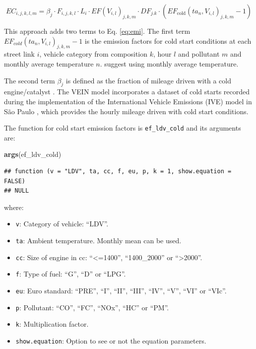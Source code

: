 \documentclass[12pt,graybox,envcountchap,sectrefs]{krantz}
\makeatletter
\newenvironment{Shaded}{\begin{snugshade}}{\end{snugshade}}
\newcommand{\KeywordTok}[1]{\textcolor[rgb]{0.13,0.29,0.53}{\textbf{#1}}}
\newcommand{\NormalTok}[1]{#1}
\providecommand{\tightlist}{%
  \setlength{\itemsep}{0pt}\setlength{\parskip}{0pt}}
\newenvironment{kframe}{%
\medskip{}
\setlength{\fboxsep}{.8em}
 \def\at@end@of@kframe{}%
 \ifinner\ifhmode%
  \def\at@end@of@kframe{\end{minipage}}%
  \begin{minipage}{\columnwidth}%
 \fi\fi%
 \def\FrameCommand##1{\hskip\@totalleftmargin \hskip-\fboxsep
 \colorbox{shadecolor}{##1}\hskip-\fboxsep
     \hskip-\linewidth \hskip-\@totalleftmargin \hskip\columnwidth}%
 \MakeFramed {\advance\hsize-\width
   \@totalleftmargin\z@ \linewidth\hsize
   \@setminipage}}%
 {\par\unskip\endMakeFramed%
 \at@end@of@kframe}
\renewenvironment{Shaded}{\begin{kframe}}{\end{kframe}}
\theoremstyle{definition}
\theoremstyle{definition}
\theoremstyle{definition}
\theoremstyle{remark}
\makeatother
\begin{document}
\begin{equation}
EC_{i,j,k,l,m} =\beta_{j} \cdot F_{i,j,k,l} \cdot L_i \cdot EF(V_{i,l})_{j,k,m} \cdot DF_{j.k} \cdot \left(EF_{\mbox{cold}}(ta_n,V_{i,l})_{j,k,m}-1\right)
\label{eq:cold}
\end{equation}

This approach adds two terms to Eq. \ref{eq:emi}. The first term
\(EF_{cold}(ta_n,V_{i,l})_{j,k,m}-1\) is the emission factors for cold
start conditions at each street link \(i\), vehicle category from
composition \(k\), hour \(l\) and pollutant \(m\) and monthly average
temperature \(n\). \citep{NtziachristosSamaras2016} suggest using
monthly average temperature.

The second term \(\beta_j\) is defined as the fraction of mileage driven
with a cold engine/catalyst \citep{NtziachristosSamaras2016}. The VEIN
model incorporates a dataset of cold starts recorded during the
implementation of the International Vehicle Emissions (IVE) model
\citep{Davisetal2005} in São Paulo \citep{ivesp}, which provides the
hourly mileage driven with cold start conditions.

The function for cold start emission factors is \texttt{ef\_ldv\_cold}
and its arguments are:

\begin{Shaded}
\begin{Highlighting}[]
\KeywordTok{args}\NormalTok{(ef_ldv_cold)}
\end{Highlighting}
\end{Shaded}

\begin{verbatim}
## function (v = "LDV", ta, cc, f, eu, p, k = 1, show.equation = FALSE) 
## NULL
\end{verbatim}

where:

\begin{itemize}
\tightlist
\item
  \texttt{v}: Category of vehicle: ``LDV''.
\item
  \texttt{ta}: Ambient temperature. Monthly mean can be used.
\item
  \texttt{cc}: Size of engine in cc: ``\textless{}=1400'',
  ``1400\_2000'' or ``\textgreater{}2000''.
\item
  \texttt{f}: Type of fuel: ``G'', ``D'' or ``LPG''.
\item
  \texttt{eu}: Euro standard: ``PRE'', ``I'', ``II'', ``III'', ``IV'',
  ``V'', ``VI'' or ``VIc''.
\item
  \texttt{p}: Pollutant: ``CO'', ``FC'', ``NOx'', ``HC'' or ``PM''.
\item
  \texttt{k}: Multiplication factor.
\item
  \texttt{show.equation}: Option to see or not the equation parameters.
\end{itemize}
\end{document}
